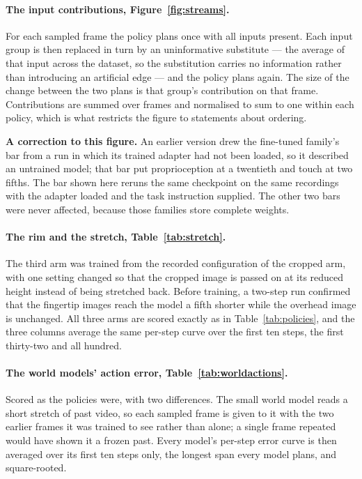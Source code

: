 \paragraph{The input contributions, Figure~\ref{fig:streams}.}
For each sampled frame the policy plans once with all inputs present. Each input
group is then replaced in turn by an uninformative substitute --- the average of
that input across the dataset, so the substitution carries no information rather
than introducing an artificial edge --- and the policy plans again. The size of
the change between the two plans is that group's contribution on that frame.
Contributions are summed over frames and normalised to sum to one within each
policy, which is what restricts the figure to statements about ordering.

\textbf{A correction to this figure.} An earlier version drew the fine-tuned
family's bar from a run in which its trained adapter had not been loaded, so it
described an untrained model; that bar put proprioception at a twentieth and
touch at two fifths. The bar shown here reruns the same checkpoint on the same
recordings with the adapter loaded and the task instruction supplied. The other
two bars were never affected, because those families store complete weights.

\paragraph{The rim and the stretch, Table~\ref{tab:stretch}.}
The third arm was trained from the recorded configuration of the cropped arm,
with one setting changed so that the cropped image is passed on at its reduced
height instead of being stretched back. Before training, a two-step run
confirmed that the fingertip images reach the model a fifth shorter while the
overhead image is unchanged. All three arms are scored exactly as in
Table~\ref{tab:policies}, and the three columns average the same per-step
curve over the first ten steps, the first thirty-two and all hundred.

\paragraph{The world models' action error, Table~\ref{tab:worldactions}.}
Scored as the policies were, with two differences. The small world model reads
a short stretch of past video, so each sampled frame is given to it with the
two earlier frames it was trained to see rather than alone; a single frame
repeated would have shown it a frozen past. Every model's per-step error curve
is then averaged over its first ten steps only, the longest span every model
plans, and square-rooted.

